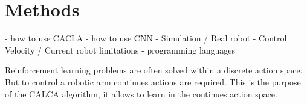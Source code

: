 \section{Methods}

- how to use CACLA
- how to use CNN
- Simulation / Real robot
- Control Velocity / Current robot limitations
- programming languages


Reinforcement learning problems are often solved within a discrete action space. But to control a robotic arm continues actions are required. This is the purpose of the CALCA
algorithm, it allows to learn in the continues action space.


